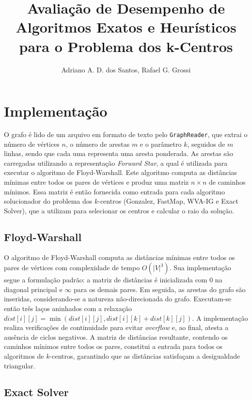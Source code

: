 \documentclass[12pt]{article}
\title{Avaliação de Desempenho de Algoritmos Exatos e Heurísticos para o Problema dos k-Centros}
\author{Adriano A. D. dos Santos\inst{1}, Rafael G. Grossi\inst{1}}
\begin{document}
 

\maketitle

\section{Implementação}

O grafo é lido de um arquivo em formato de texto pelo \texttt{GraphReader}, que extrai o número de vértices $n$, o número de arestas $m$ e o parâmetro $k$, seguidos de $m$ linhas, sendo que cada uma representa uma aresta ponderada. As arestas são carregadas utilizando a representação \textit{Forward Star}, a qual é utilizada para executar o algoritmo de Floyd-Warshall. Este algoritmo computa as distâncias mínimas entre todos os pares de vértices e produz uma matriz $n \times n$ de caminhos mínimos. Essa matriz é então fornecida como entrada para cada algoritmo solucionador do problema dos $k$-centros (Gonzalez, FastMap, WVA-IG e Exact Solver), que a utilizam para selecionar os centros e calcular o raio da solução.

\subsection{Floyd-Warshall} \label{floyd-warshall}

O algoritmo de Floyd-Warshall computa as distâncias mínimas entre todos os pares de vértices com complexidade de tempo $O(|V|^3)$. Sua implementação segue a formulação padrão: a matriz de distâncias é inicializada com $0$ na diagonal principal e $\infty$ para os demais pares. Em seguida, as arestas do grafo são inseridas, considerando-se a natureza não-direcionada do grafo. Executam-se então três laços aninhados com a relaxação $dist[i][j] = \min(dist[i][j], dist[i][k] + dist[k][j])$. A implementação realiza verificações de continuidade para evitar \textit{overflow} e, ao final, atesta a ausência de ciclos negativos. A matriz de distâncias resultante, contendo os caminhos mínimos entre todos os pares, constitui a entrada para todos os algoritmos de $k$-centros, garantindo que as distâncias satisfaçam a desigualdade triangular.

\subsection{Exact Solver} \label{exact-solver}
\end{document}
